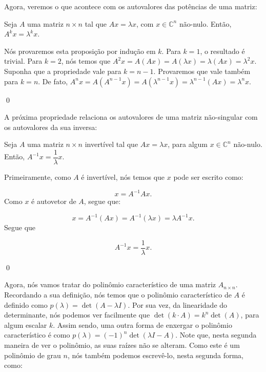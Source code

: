 Agora, veremos o que acontece com os autovalores das potências de uma matriz:

\begin{Proposition}
	Seja $A$ uma matriz $n\times n$ tal que $Ax = \lambda x$, com $x\in\mathbb{C}^n$ não-nulo. Então, $A^{k}x = \lambda^{k}x$.
\end{Proposition}

\begin{Proof}
	Nós provaremos esta proposição por indução em $k$. Para $k = 1$, o resultado é trivial. Para $k = 2$, nós temos que $A^2x = A(Ax) = A(\lambda x) = \lambda(Ax) = \lambda^2 x$. Suponha que a propriedade vale para $k = n - 1$. Provaremos que vale também para $k = n$. De fato, $A^{n}x = A(A^{n - 1}x) = A(\lambda^{n - 1}x) = \lambda^{n - 1}(Ax) = \lambda^n x$.
	
	\qed
\end{Proof}

A próxima propriedade relaciona os autovalores de uma matriz não-singular com os autovalores da sua inversa:

\begin{Proposition}
	Seja $A$ uma matriz $n\times n$ invertível tal que $Ax = \lambda x$, para algum $x\in\mathbb{C}^n$ não-nulo. Então, $A^{-1}x = \dfrac{1}{\lambda}x$.
\end{Proposition}

\begin{Proof}
	Primeiramente, como $A$ é invertível, nós temos que $x$ pode ser escrito como:
	
	$$
	x = A^{-1}Ax.
	$$
	Como $x$ é autovetor de $A$, segue que:
	
	$$
	x = A^{-1}(Ax) = A^{-1}(\lambda x) = \lambda A^{-1}x.
	$$
	Segue que
	
	$$
	A^{-1}x = \dfrac{1}{\lambda}x.
	$$
	
	\qed
\end{Proof}

Agora, nós vamos tratar do polinômio característico de uma matriz $A_{n\times n}$. Recordando a sua definição, nós temos que o polinômio característico de $A$ é definido como $p(\lambda) = \det(A - \lambda I)$. Por sua vez, da linearidade do determinante, nós podemos ver facilmente que $\det(k\cdot A) = k^n\det(A)$, para algum escalar $k$. Assim sendo, uma outra forma de enxergar o polinômio característico é como $p(\lambda) = (-1)^n\det(\lambda I - A)$. Note que, nesta segunda maneira de ver o polinômio, as suas raízes não se alteram. Como este é um polinômio de grau $n$, nós também podemos escrevê-lo, nesta segunda forma, como:

